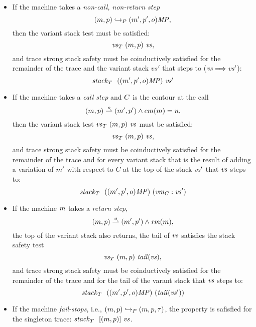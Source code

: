\documentclass[acmsmall,review,anonymous]{acmart}\settopmatter{printfolios=true,printccs=false,printacmref=false}
\begin{document}
\begin{itemize}

\item
  If the machine takes a \emph{non-call, non-return step}
  \[(m, p) \hookrightarrow_P (m', p', o)\mathit{MP},\]
  then the variant stack test must be satisfied:
  \[\mathit{\mathit{vs}}_T ~ (m, p) ~ \mathit{vs},\]
  and trace strong stack safety must be coinductively satisfied for
  the remainder of the trace and the variant stack $vs'$ that
  steps to ($\mathit{vs} \Longrightarrow \mathit{vs}'$):
  \[ \mathit{stack}_T ~  ~ ((m',p',o)\mathit{MP}) ~ \mathit{vs}'\]

\item
  If the machine takes a \emph{call step} and $C$ is the contour at
  the call 
  \[(m, p) \overset{o}{\rightharpoonup} (m', p') \wedge cm(m) = n,\]
%
  then the variant stack test $\mathit{\mathit{vs}}_T ~ (m, p) ~ \mathit{vs}$ must be
  satisfied:
  \[\mathit{\mathit{vs}}_T ~ (m, p) ~ \mathit{vs},\]
%
%
  and trace strong stack safety must be coinductively satisfied
  for the remainder of the trace and for every variant stack
  that is the result of adding a variation of $m'$ with
  respect to $C$ at the top of the stack $\mathit{vs}'$ that $\mathit{vs}$ steps
  to:
  \[\mathit{stack}_T ~  ~ ((m', p', o)\mathit{MP}) ~ (\mathit{vm}_{C} : \mathit{vs}')\]

\item
%
  If the machine $m$ takes a \emph{return step},
  \[(m, p) \overset{o}{\rightharpoonup} (m', p') \wedge \mathit{rm}(m),\]
  the top of the variant stack also returns,
  the tail of $\mathit{vs}$ satisfies the stack safety test
  \[\mathit{\mathit{vs}}_T ~ (m, p) ~ \mathit{tail}(\mathit{vs}),\]
  and trace strong stack safety must be coinductively satisfied for
  the remainder of the trace and for the tail of the varant stack
  that $\mathit{vs}$ steps to:
  \[\mathit{stack}_T ~  ~ ((m', p', o)\mathit{MP}) ~ (\mathit{tail}(\mathit{vs}'))\]

\item If the machine \emph{fail-stops}, i.e., $(m, p) \hookrightarrow_P
    (m, p, \tau)$, the property is safisfied for the singleton trace:
    $\mathit{stack}_T ~  ~ [(m, p)] ~ \mathit{vs}$.


  \end{itemize}
\end{document}
